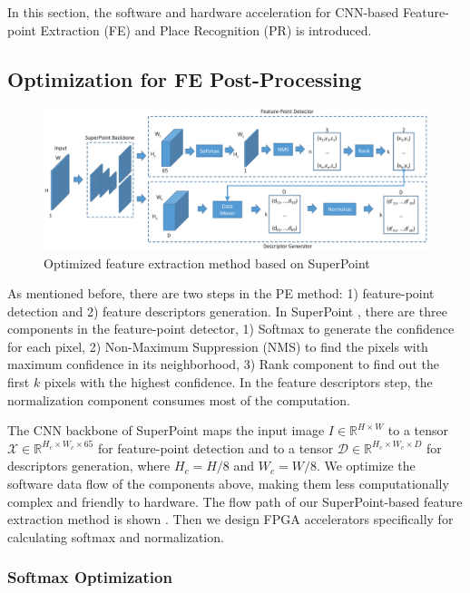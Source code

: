 \label{sec:hardsoftcodesign}
In this section, the software and hardware acceleration for CNN-based Feature-point Extraction (FE) and Place Recognition (PR) is introduced.

\subsection{Optimization for FE Post-Processing}
\label{subsec:FEopt}

\begin{figure}[t]
    \centering  
    \includegraphics[width=1\linewidth]{fig/superpoint.eps}
    \caption{Optimized feature extraction method based on SuperPoint}
    \label{fig:superpoint}
\end{figure}

As mentioned before, there are two steps in the PE method: 1) feature-point detection and 2) feature descriptors generation. 
In SuperPoint \cite{detone2018superpoint}, there are three components in the feature-point detector, 1) Softmax to generate the confidence for each pixel, 2) Non-Maximum Suppression (NMS) to find the pixels with maximum confidence in its neighborhood, 3) Rank component to find out the first $k$ pixels with the highest confidence. 
In the feature descriptors step, the normalization component consumes most of the computation. 

The CNN backbone of SuperPoint maps the input image $I\in \mathbb{R}^{H\times W}$ to a tensor $\mathcal{X}\in \mathbb{R}^{H_c\times W_c\times 65}$ for feature-point detection and to a tensor $\mathcal{D}\in \mathbb{R}^{H_c\times W_c\times D}$ for descriptors generation, where $H_c = H/8$ and $W_c = W/8$.
We optimize the software data flow of the components above, making them less computationally complex and friendly to hardware. 
The flow path of our SuperPoint-based feature extraction method is shown . 
Then we design FPGA accelerators specifically for calculating softmax and normalization.

\subsubsection{Softmax Optimization}
\label{sec:softmaxopt}

